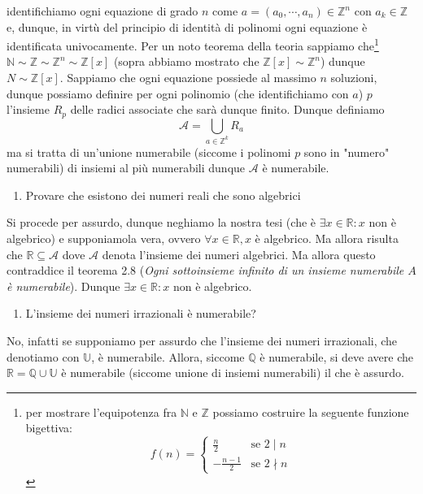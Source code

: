 \documentclass{report}
\begin{document}
\begin{mysolution}
	identifichiamo ogni equazione di grado $n$ come $a = (a_0, \cdots , a_n) \in \mathbb{Z}^n$ con $a_k \in \mathbb{Z}$ e, dunque, in virtù del principio di identità di polinomi ogni equazione è identificata univocamente. Per un noto teorema della teoria sappiamo che\footnote{per mostrare l'equipotenza fra $\mathbb{N}$ e $\mathbb{Z}$ possiamo costruire la seguente funzione bigettiva: \begin{equation*}
	f(n) = \begin{cases} \frac{n}{2} & \text{se } 2 \mid n \\ -\frac{n-1}{2} & \text{se } 2 \nmid n \end{cases}	
\end{equation*}
} $\mathbb{N} \sim \mathbb{Z} \sim \mathbb{Z}^n \sim \mathbb{Z}[x]$ (sopra abbiamo mostrato che $\mathbb{Z}[x] \sim \mathbb{Z}^n$) dunque $N \sim \mathbb{Z}[x]$. Sappiamo che ogni equazione possiede al massimo $n$ soluzioni, dunque possiamo definire per ogni polinomio (che identifichiamo con $a$) $p$ l'insieme $R_p$ delle radici associate che sarà dunque finito. Dunque definiamo $$\mathcal{A} = \bigcup_{a \in \mathbb{Z}^k} R_a$$ ma si tratta di un'unione numerabile (siccome i polinomi $p$ sono in "numero" numerabili) di insiemi al più numerabili dunque $\mathcal{A}$ è numerabile.
\end{mysolution}
\begin{enumerate}[resume, label=\protect\circled{\arabic*}]
	\item Provare che esistono dei numeri reali che sono algebrici
\end{enumerate}
\begin{mysolution}
	Si procede per assurdo, dunque neghiamo la nostra tesi (che è $\exists x \in \mathbb{R}: x$ non è algebrico) e supponiamola vera, ovvero $\forall x \in \mathbb{R}, x$ è algebrico. Ma allora risulta che $\mathbb{R} \subseteq \mathcal{A}$ dove $\mathcal{A}$ denota l'insieme dei numeri algebrici. Ma allora questo contraddice il teorema 2.8 (\emph{Ogni sottoinsieme infinito di un insieme numerabile $A$ è numerabile}). Dunque $\exists x \in \mathbb{R}: x$ non è algebrico.
\end{mysolution}
\begin{enumerate}[resume, label=\protect\circled{\arabic*}]
	\item L'insieme dei numeri irrazionali è numerabile?
\end{enumerate}
\begin{mysolution} No, infatti se supponiamo per assurdo che l'insieme dei numeri irrazionali, che denotiamo con $\mathbb{U}$, è numerabile. Allora, siccome $\mathbb{Q}$ è numerabile, si deve avere che $\mathbb{R} = \mathbb{Q} \cup \mathbb{U}$ è numerabile (siccome unione di insiemi numerabili) il che è assurdo.
\end{mysolution}
\end{document}
